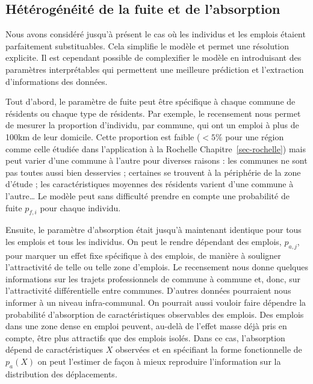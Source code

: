 \documentclass[
  10pt,
  a4paper,
  numbers=noendperiod,
  DIV=9]{scrartcl}
\begin{document}
\hypertarget{sec-hetero}{%
\subsection{Hétérogénéité de la fuite et de
l'absorption}\label{sec-hetero}}

Nous avons considéré jusqu'à présent le cas où les individus et les
emplois étaient parfaitement substituables. Cela simplifie le modèle et
permet une résolution explicite. Il est cependant possible de
complexifier le modèle en introduisant des paramètres interprétables qui
permettent une meilleure prédiction et l'extraction d'informations des
données.

Tout d'abord, le paramètre de fuite peut être spécifique à chaque
commune de résidents ou chaque type de résidents. Par exemple, le
recensement nous permet de mesurer la proportion d'individu, par
commune, qui ont un emploi à plus de 100km de leur domicile. Cette
proportion est faible (\(<5\%\) pour une région comme celle étudiée dans
l'application à la Rochelle Chapitre~\ref{sec-rochelle}) mais peut
varier d'une commune à l'autre pour diverses raisons : les communes ne
sont pas toutes aussi bien desservies ; certaines se trouvent à la
périphérie de la zone d'étude ; les caractéristiques moyennes des
résidents varient d'une commune à l'autre\ldots{} Le modèle peut sans
difficulté prendre en compte une probabilité de fuite \(p_{f,i}\) pour
chaque individu.

Ensuite, le paramètre d'absorption était jusqu'à maintenant identique
pour tous les emplois et tous les individus. On peut le rendre dépendant
des emplois, \(p_{a,j}\), pour marquer un effet fixe spécifique à des
emplois, de manière à souligner l'attractivité de telle ou telle zone
d'emplois. Le recensement nous donne quelques informations sur les
trajets professionnels de commune à commune et, donc, sur l'attractivité
différentielle entre communes. D'autres données pourraient nous informer
à un niveau infra-communal. On pourrait aussi vouloir faire dépendre la
probabilité d'absorption de caractéristiques observables des emplois.
Des emplois dans une zone dense en emploi peuvent, au-delà de l'effet
masse déjà pris en compte, être plus attractifs que des emplois isolés.
Dans ce cas, l'absorption dépend de caractéristiques \(X\) observées et
en spécifiant la forme fonctionnelle de \(p_a(X)\) on peut l'estimer de
façon à mieux reproduire l'information sur la distribution des
déplacements.
\end{document}
